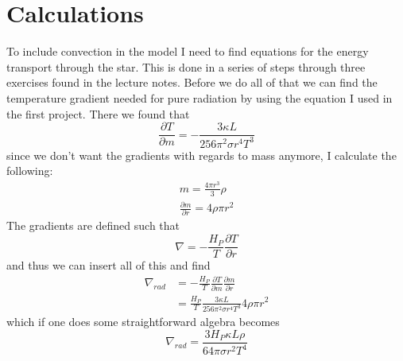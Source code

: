 \documentclass[a4paper,12pt]{article}
\begin{document}
\section{Calculations}
To include convection in the model I need to find equations for the energy transport through the star. This is done in a series of steps through three exercises found in the lecture notes. Before we do all of that we can find the temperature gradient needed for pure radiation by using the equation I used in the first project.
There we found that 
\begin{equation}
 \frac{\partial T}{\partial m} = -\frac{3\kappa L}{256\pi^2\sigma r^4 T^3}
\end{equation}
since we don't want the gradients with regards to mass anymore, I calculate the following:
\begin{equation*}
\begin{aligned}
 m = \frac{4\pi r^3}{3}\rho\\
 \frac{\partial m}{\partial r} = 4\rho \pi r^2 
\end{aligned}
\end{equation*}
The gradients are defined such that
\begin{equation}
 \nabla = -\frac{H_P}{T}\frac{\partial T}{\partial r}
\end{equation}
and thus we can insert all of this and find
\begin{equation*}
\begin{aligned}
 \nabla_{rad} &= -\frac{H_P}{T}\frac{\partial T}{\partial m} \frac{\partial m}{\partial r}\\
 &= \frac{H_P}{T}\frac{3\kappa L}{256\pi^2\sigma r^4 T^3}4\rho \pi r^2 
\end{aligned}
\end{equation*}
which if one does some straightforward algebra becomes
\begin{equation}
  \nabla_{rad} =\frac{3H_P\kappa L\rho}{64\pi\sigma r^2 T^4}
\end{equation}
\end{document}
